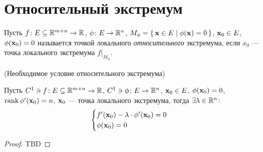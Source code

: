 \section{Относительный экстремум}

\begin{definition}
    Пусть $f \colon E \subseteq \mathbb{R}^{m + n} \to \mathbb{R}$, $\phi \colon E \to \mathbb{R}^n$,
    $M_{\phi} = \{\,\mathbf{x} \in E \mid \phi(\mathbf{x}) = 0\,\}$, $\mathbf{x}_0 \in E$, $\phi(\mathbf{x}_0) =
    0$ называется точкой локального \textit{относительного} экстремума, если
    $x_0$ --- точка локального экстремума $f\big|_{M_{\phi}}$.
\end{definition}

\begin{theorem}(Необходимое условие относительного экстремума)

    Пусть $C^1 \ni f \colon E \subseteq \mathbb{R}^{m + n} \to \mathbb{R}$, $C^1 \ni \phi \colon
    E \to \mathbb{R}^n$, $\mathbf{x}_0 \in E$, $\phi(\mathbf{x}_0) = 0$, $\operatorname{rank}{\phi'(\mathbf{x}_0)} = n$,
    $\mathbf{x}_0$ --- точка локального экстремума, тогда $\exists \lambda \in \mathbb{R}^n
    \colon$
\[
    \begin{cases}
        f'(\mathbf{x}_0) - \lambda \cdot \phi'(\mathbf{x}_0) = 0 \\
        \phi(\mathbf{x}_0) = 0
    \end{cases}
\]
\end{theorem}
\begin{proof}
    TBD
\end{proof}

